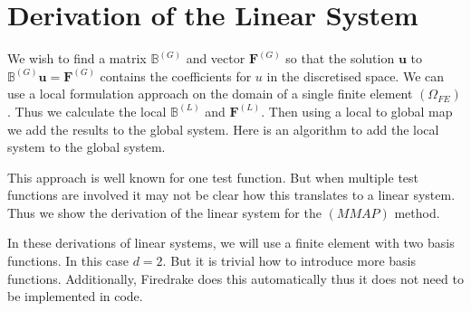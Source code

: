 \documentclass[12pt]{ociamthesis}
\begin{document}
\section{Derivation of the Linear System}
We wish to find a matrix $\mathbb{B}^{(G)}$ and vector $\mathbf{F}^{(G)}$ so that the solution $\mathbf{u}$ to $\mathbb{B}^{(G)} \mathbf{u} = \mathbf{F}^{(G)}$ contains the coefficients for $u$ in the discretised space. We can use a local formulation approach on the domain of a single finite element $(\Omega_{FE})$. Thus we calculate the local $\mathbb{B}^{(L)}$ and $\mathbf{F}^{(L)}$. Then using a local to global map we add the results to the global system. Here is an algorithm to add the local system to the global system.

This approach is well known for one test function. But when multiple test functions are involved it may not be clear how this translates to a linear system. Thus we show the derivation of the linear system for the $(MMAP)$ method.

In these derivations of linear systems, we will use a finite element with two basis functions. In this case $d=2$. But it is trivial how to introduce more basis functions. Additionally, Firedrake \cite{Dragon} does this automatically thus it does not need to be implemented in code.
\end{document}
